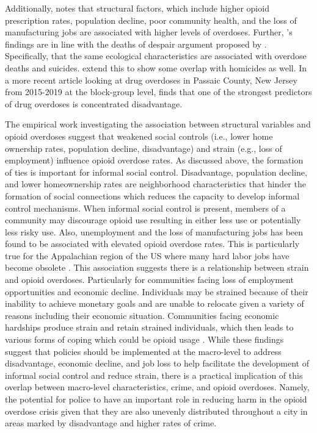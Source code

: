 Additionally, \textcite{feldmeyer_community_2022} notes that structural factors, which include higher opioid prescription rates, population decline, poor community health, and the loss of manufacturing jobs are associated with higher levels of overdoses. Further, \textcite{feldmeyer_community_2022}'s findings are in line with the deaths of despair argument proposed by \textcite{case_rising_2015, case_mortality_2017}. Specifically, that the same ecological characteristics are associated with overdose deaths and suicides. \textcite{feldmeyer_community_2022} extend this to show some overlap with homicides as well. In a more recent article looking at drug overdoses in Passaic County, New Jersey from 2015-2019 at the block-group level, \textcite{piza_drug_2023} finds that one of the strongest predictors of drug overdoses is concentrated disadvantage. 

The empirical work investigating the association between structural variables and opioid overdoses suggest that weakened social controls (i.e., lower home ownership rates, population decline, disadvantage) and strain (e.g., loss of employment) influence opioid overdose rates. As discussed above, the formation of ties is important for informal social control. Disadvantage, population decline, and lower homeownership rates are neighborhood characteristics that hinder the formation of social connections which reduces the capacity to develop informal control mechanisms. When informal social control is present, members of a community may discourage opioid use resulting in either less use or potentially less risky use. Also, unemployment and the loss of manufacturing jobs has been found to be associated with elevated opioid overdose rates. This is particularly true for the Appalachian region of the US where many hard labor jobs have become obsolete \parencite{mclean_theres_2016}. This association suggests there is a relationship between strain and opioid overdoses. Particularly for communities facing loss of employment opportunities and economic decline. Individuals may be strained because of their inability to achieve monetary goals and are unable to relocate given a variety of reasons including their economic situation. Communities facing economic hardships produce strain and retain strained individuals, which then leads to various forms of coping which could be opioid usage \parencite{monnat_factors_2018, monnat_contributions_2019}. While these findings suggest that policies should be implemented at the macro-level to address disadvantage, economic decline, and job loss to help facilitate the development of informal social control and reduce strain, there is a practical implication of this overlap between macro-level characteristics, crime, and opioid overdoses. Namely, the potential for police to have an important role in reducing harm in the opioid overdose crisis given that they are also unevenly distributed throughout a city in areas marked by disadvantage and higher rates of crime.

